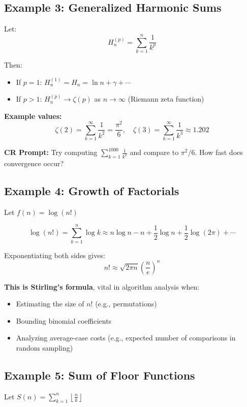 \documentclass{article}
\begin{document}
\subsection*{Example 3: Generalized Harmonic Sums}

Let:
\[
H_n^{(p)} = \sum_{k=1}^{n} \frac{1}{k^p}
\]

Then:
\begin{itemize}
    \item If $p = 1$: $H_n^{(1)} = H_n = \ln n + \gamma + \cdots$
    \item If $p > 1$: $H_n^{(p)} \to \zeta(p)$ as $n \to \infty$ (Riemann zeta function)
\end{itemize}

\textbf{Example values:}
\[
\zeta(2) = \sum_{k=1}^{\infty} \frac{1}{k^2} = \frac{\pi^2}{6},\quad
\zeta(3) = \sum_{k=1}^{\infty} \frac{1}{k^3} \approx 1.202
\]

\textbf{CR Prompt:} Try computing $\sum_{k=1}^{1000} \frac{1}{k^2}$ and compare to $\pi^2/6$. How fast does convergence occur?

\subsection*{Example 4: Growth of Factorials}

Let $f(n) = \log(n!)$

\[
\log(n!) = \sum_{k=1}^{n} \log k \approx n \log n - n + \frac{1}{2} \log n + \frac{1}{2} \log(2\pi) + \cdots
\]

Exponentiating both sides gives:
\[
n! \approx \sqrt{2\pi n} \left( \frac{n}{e} \right)^n
\]

\textbf{This is Stirling’s formula}, vital in algorithm analysis when:
\begin{itemize}
    \item Estimating the size of $n!$ (e.g., permutations)
    \item Bounding binomial coefficients
    \item Analyzing average-case costs (e.g., expected number of comparisons in random sampling)
\end{itemize}

\subsection*{Example 5: Sum of Floor Functions}

Let $S(n) = \sum_{k=1}^{n} \left\lfloor \frac{n}{k} \right\rfloor$
\end{document}
